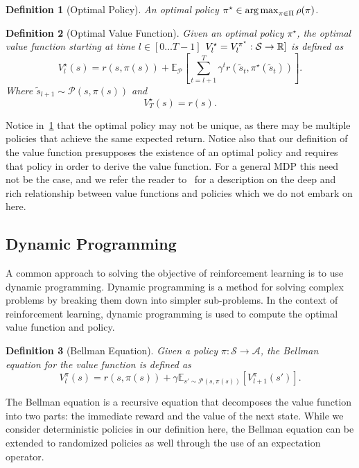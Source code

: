 \documentclass[10pt]{article}
\newtheorem{definition}{Definition}
\renewcommand{\cite}{\citep}
\theoremstyle{plain}
\theoremstyle{remark}
\begin{document}
\begin{definition}[Optimal Policy]\label{def:optimal_policy}
        An optimal policy $\pi^\star \in \operatorname*{arg\,max}_{\pi \in \Pi} \rho(\pi)$.
\end{definition}

\begin{definition}[Optimal Value Function]\label{def:optimal_value_function}
        Given an optimal policy $\pi^\star$, the optimal value function starting at time $l \in [0\ldots T-1]$ $V^\star_l = V^{\pi^\star}_l : \mathcal{S} \to \mathbb{R}]$ is defined as
        \[
          V^\star_l(s) = r(s,\pi(s)) + \mathbb{E}_{\mathcal{P}} \left[ \sum_{t=l+1}^{T} \gamma^t r(\tilde{s}_t, \pi^\star(\tilde{s}_t)) \right].
        \]
        Where $\tilde{s}_{l+1} \sim \mathcal{P}(s, \pi(s))$ and
        \[
          V^\star_T(s) = r(s).
        \]
\end{definition}

Notice in~\ref{def:optimal_policy} that the optimal policy may not be unique, as there may be multiple policies that achieve the same expected return. Notice also that our definition of the value function presupposes the existence of an optimal policy and requires that policy in order to derive the value function. For a general MDP this need not be the case, and we refer the reader to~\cite{Puterman1994} for a description on the deep and rich relationship between value functions and policies which we do not embark on here.


\subsection{Dynamic Programming}
A common approach to solving the objective of reinforcement learning is to use dynamic programming. Dynamic programming is a method for solving complex problems by breaking them down into simpler sub-problems. In the context of reinforcement learning, dynamic programming is used to compute the optimal value function and policy.

\begin{definition}[Bellman Equation]\label{def:bellman}
        Given a policy $\pi : \mathcal{S} \to \mathcal{A}$, the Bellman equation for the value function is defined as
        \[
                V^\pi_l(s) = r(s, \pi(s)) + \gamma \mathbb{E}_{s' \sim \mathcal{P}(s, \pi(s))} [V^\pi_{l+1}(s')].
        \]
\end{definition}
The Bellman equation is a recursive equation that decomposes the value function into two parts: the immediate reward and the value of the next state. While we
consider deterministic policies in our definition here, the Bellman equation can be extended to randomized policies as well through the use of an expectation operator.
\end{document}
